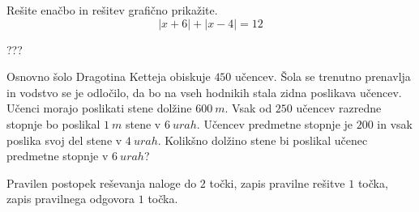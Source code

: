 \documentclass[addpoints]{exam}
\begin{document}
\begin{questions}
    
    







    \question[7]
    Rešite enačbo in rešitev grafično prikažite.
    $$\left\lvert x+6 \right\rvert + \left\lvert x-4 \right\rvert=12 $$
    
    
    \begin{solution}[10cm]
        ???
    \end{solution}

    \newpage

    
    




    \question[5]
    Osnovno šolo Dragotina Ketteja obiskuje $450$ učencev. Šola se trenutno prenavlja in vodstvo se je odločilo, da bo na vseh hodnikih stala zidna poslikava učencev.
    Učenci morajo poslikati stene dolžine $600~m$. Vsak od $250$ učencev razredne stopnje bo poslikal $1~m$ stene v $6~urah$. Učencev predmetne stopnje je $200$ in vsak poslika svoj del stene v $4~urah$.
    Kolikšno dolžino stene bi poslikal učenec predmetne stopnje v $6~urah$?
    
    
    \begin{solution}[3cm]
        Pravilen postopek reševanja naloge do $2$ točki, zapis pravilne rešitve $1$ točka, zapis pravilnega odgovora $1$ točka.
    \end{solution}


\end{questions}
\end{document}

